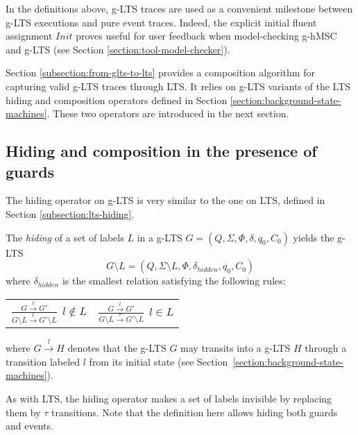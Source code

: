 In the definitions above, g-LTS traces are used as a convenient milestone between g-LTS executions and pure event traces. Indeed, the explicit initial fluent assignment $Init$ proves useful for user feedback when model-checking g-hMSC and g-LTS (see Section \ref{section:tool-model-checker}). 

Section \ref{subsection:from-glts-to-lts} provides a composition algorithm for capturing valid g-LTS traces through LTS. It relies on g-LTS variants of the LTS hiding and composition operators defined in Section \ref{section:background-state-machines}. These two operators are introduced in the next section.

\subsection{Hiding and composition in the presence of guards}

The hiding operator on g-LTS is very similar to the one on LTS, defined in Section \ref{subsection:lts-hiding}. 

\begin{definition}
The \emph{hiding} of a set of labels $L$ in a g-LTS $G = (Q,\Sigma,\Phi,\delta,q_{0},C_{0})$ yields the g-LTS
\begin{equation*}
G \setminus L = (Q,\Sigma \setminus L,\Phi,\delta_{hidden},q_{0},C_0)
\end{equation*}
\noindent where $\delta_{hidden}$ is the smallest relation satisfying the following rules:
\begin{center}
\begin{tabular}{cc}
$\frac{\displaystyle G \stackrel{l}{\longrightarrow} G'}{\displaystyle G \setminus L \stackrel{l}{\longrightarrow} G' \setminus L}~~l \notin L$ & 
$\frac{\displaystyle G \stackrel{l}{\longrightarrow} G'}{\displaystyle G \setminus L \stackrel{\tau}{\longrightarrow} G' \setminus L}~~l \in L$ \\
\end{tabular}
\end{center}
where $G \stackrel{l}{\longrightarrow} H$ denotes that the g-LTS $G$ may transits into a g-LTS $H$ through a transition labeled $l$ from its initial state (see Section~\ref{section:background-state-machines}). 
\end{definition}

As with LTS, the hiding operator makes a set of labels invisible by replacing them by $\tau$ transitions. Note that the definition here allows hiding both guards and events. 

